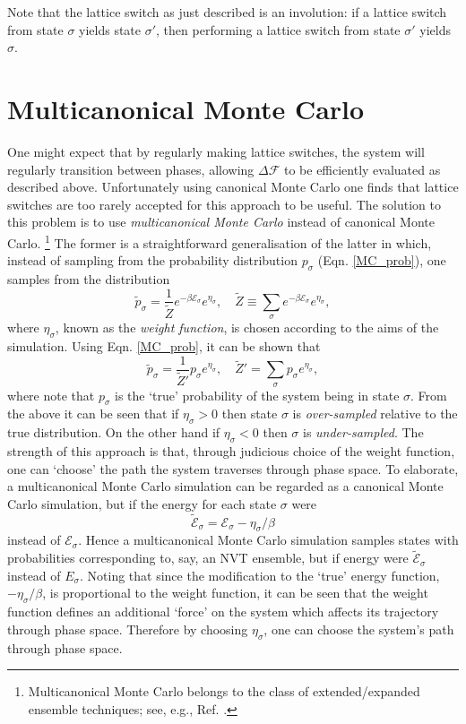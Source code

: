 \documentclass{report}
\begin{document}
Note that the lattice switch as just described is an involution: if a lattice switch from state $\sigma$ yields state $\sigma'$, then
performing a lattice switch from state $\sigma'$ yields $\sigma$.


\section{Multicanonical Monte Carlo}
One might expect that by regularly making lattice switches, the system will regularly transition between phases, allowing $\Delta \mathcal{F}$ to 
be efficiently evaluated as described above. Unfortunately using canonical Monte Carlo one finds that lattice switches are too rarely accepted for 
this approach to be useful.
The solution to this problem is to use \emph{multicanonical Monte Carlo}\cite{Berg_1991,Berg_1992,Smith_1995} instead of canonical Monte Carlo.
\footnote{Multicanonical Monte Carlo belongs to the class of extended/expanded ensemble techniques; see, e.g., Ref. \cite{Iba_2001}.}
The former is a straightforward generalisation of the latter in which, instead of sampling from the probability distribution $p_{\sigma}$ 
(Eqn. \eqref{MC_prob}), one samples from the distribution
\begin{equation}\label{MCMC_prob}
\tilde{p}_{\sigma}=\frac{1}{\tilde{Z}}e^{-\beta \mathcal{E}_{\sigma}}e^{\eta_{\sigma}}, \quad \tilde{Z}\equiv\sum_{\sigma}e^{-\beta \mathcal{E}_{\sigma}}e^{\eta_{\sigma}},
\end{equation}
where $\eta_{\sigma}$, known as the \emph{weight function}, is chosen according to the aims of the simulation. 
Using Eqn. \eqref{MC_prob}, it can be shown that
\begin{equation}\label{MCMC_prob_2}
\tilde{p}_{\sigma}=\frac{1}{\tilde{Z}'}p_{\sigma}e^{\eta_{\sigma}}, \quad \tilde{Z}'=\sum_{\sigma}p_{\sigma}e^{\eta_{\sigma}},
\end{equation}
where note that $p_{\sigma}$ is the `true' probability of the system being in state $\sigma$. From the above it can be seen that if 
$\eta_{\sigma}>0$ then state $\sigma$ is \emph{over-sampled} relative to the true distribution. On the other hand if $\eta_{\sigma}<0$ then 
$\sigma$ is \emph{under-sampled}. 
The strength of this approach is that, through judicious choice of the weight function, one can `choose' the path the system traverses 
through phase space. To elaborate, a multicanonical Monte Carlo simulation can be regarded as a canonical Monte Carlo 
simulation, but if the energy for each state $\sigma$ were 
\begin{equation}
\tilde{\mathcal{E}}_{\sigma}=\mathcal{E}_{\sigma}-\eta_{\sigma}/\beta
\end{equation}
instead of $\mathcal{E}_{\sigma}$. Hence a multicanonical Monte Carlo simulation samples states with probabilities corresponding to, say, an NVT ensemble,
but if energy were $\tilde{\mathcal{E}}_{\sigma}$ instead of $E_{\sigma}$. Noting that since the modification to the `true' energy function, 
$-\eta_{\sigma}/\beta$, is proportional to the weight function, it can be seen that the weight function defines an additional `force' on the system 
which affects its trajectory through phase space. Therefore by choosing $\eta_{\sigma}$, one can choose the system's path through phase space. 
\end{document}
